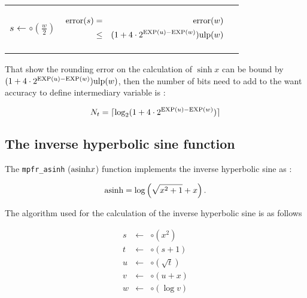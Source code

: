\documentclass[12pt]{amsart}
\def\n{\textnormal}
\def\ulp{{\rm ulp}}
\def\Exp{{\rm EXP}}
\begin{document}
\begin{center}
\begin{tabular}{l l l}
\begin{minipage}{2.5cm}
$s \leftarrow \circ(\frac{w}{2}) $
\end{minipage} &
\begin{minipage}{7.5cm}

\begin{center}


\begin{eqnarray}\nonumber
 {\textnormal{error}}(s) & = &  {\textnormal{error}}(w)\\\nonumber
 & \leq &  (1+ 4 \cdot 2^{\Exp(u)-\Exp(w)}) \ulp(w)
\end{eqnarray}



\end{center}

\end{minipage} &
\begin{minipage}{6cm}


\end{minipage}


\end{tabular}
\end{center}


That show the rounding error on the calculation of $\sinh x$ can be bound by $(1+ 4 \cdot 2^{\Exp(u)-\Exp(w)}) \ulp(w)$, then the number of bits need to add to the want accuracy to define intermediary variable is :

\[
N_t=\lceil \log_2(1+ 4 \cdot 2^{\Exp(u)-\Exp(w)}) \rceil
\]


\subsection{The inverse hyperbolic sine function}

The {\tt mpfr\_asinh} ($\n{asinh}{x}$) function implements the inverse hyperbolic sine as :

\[\n{asinh} = \log \left( \sqrt{x^2+1} + x \right).\]

The algorithm used for the calculation of the inverse hyperbolic sine is as follows

\begin{eqnarray}\nonumber
s&\leftarrow&\circ(x^2)\\\nonumber
t&\leftarrow&\circ(s+1)\\\nonumber
u&\leftarrow&\circ(\sqrt{t})\\\nonumber
v&\leftarrow&\circ(u+x)\\\nonumber
w&\leftarrow&\circ(\log  v)
\end{eqnarray}
\end{document}
